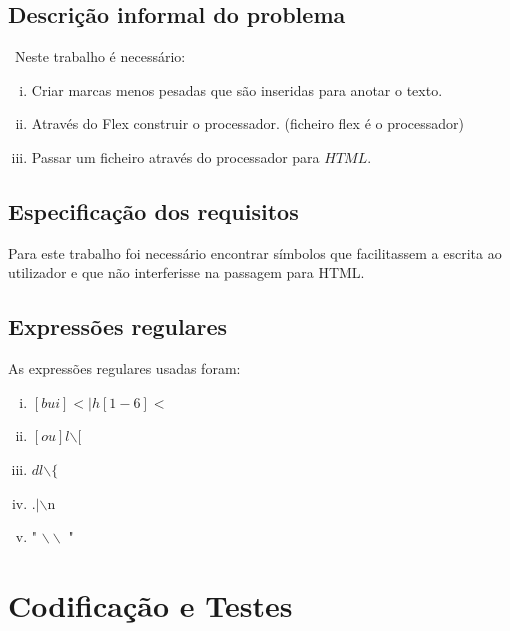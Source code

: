 \documentclass{report}
\begin{document}
\section{Descrição informal do problema}\
Neste trabalho é necessário:
\begin{enumerate}[i)]
\item Criar marcas menos pesadas que são inseridas para anotar o texto.
\item Através do Flex construir o processador. (ficheiro flex é o processador)
\item Passar um ficheiro através do processador para $HTML$.
\end{enumerate}

\section{Especificação dos requisitos}


Para este trabalho foi necessário  encontrar símbolos que facilitassem a escrita ao utilizador e que não interferisse na passagem para HTML. 

%

\section{Expressões regulares} 

As expressões regulares usadas foram:

\begin{enumerate}[i)]
\item $ [bui]< | h[1-6]< $
\item $ [ou]l$$\backslash$$[$
\item $ dl$$\backslash$$\{$
\item $ .|$$\backslash$n
\item " $\backslash\backslash$ "

\end{enumerate}

\chapter{Codificação e Testes}
\end{document}
